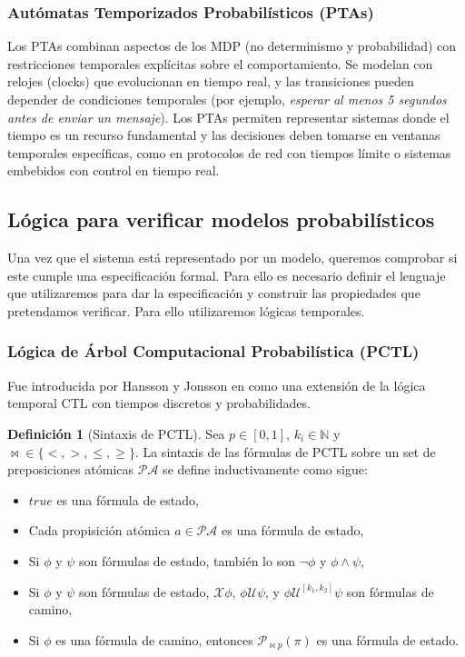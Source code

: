 \documentclass[runningheads]{llncs}
\begin{document}
\subsubsection{Autómatas Temporizados Probabilísticos (PTAs)}

Los PTAs combinan aspectos de los MDP (no determinismo y probabilidad) con restricciones temporales explícitas sobre el comportamiento. Se modelan con relojes (clocks) que evolucionan en tiempo real, y las transiciones pueden depender de condiciones temporales (por ejemplo, \textit{esperar al menos 5 segundos antes de enviar un mensaje}). Los PTAs permiten representar sistemas donde el tiempo es un recurso fundamental y las decisiones deben tomarse en ventanas temporales específicas, como en protocolos de red con tiempos límite o sistemas embebidos con control en tiempo real.

\subsection{Lógica para verificar modelos probabilísticos}

Una vez que el sistema está representado por un modelo, queremos comprobar si este cumple una especificación formal. Para ello es necesario definir el lenguaje que utilizaremos para dar la especificación y construir las propiedades que pretendamos verificar. Para ello utilizaremos lógicas temporales.

\subsubsection{Lógica de Árbol Computacional Probabilística (PCTL)}

Fue introducida por Hansson y Jonsson en \cite{HH94} como una extensión de la lógica temporal CTL con tiempos discretos y probabilidades. \par

\textbf{Definición 1} (Sintaxis de PCTL). Sea $p\in[0,1]$, $k_i\in\mathbb{N}$ y $\bowtie\in\{<,>,\le,\ge\}$. La sintaxis de las fórmulas de PCTL sobre un set de preposiciones atómicas $\mathcal{PA}$ se define inductivamente como sigue:
\begin{itemize}
    \item $true$ es una fórmula de estado,
    \item Cada propisición atómica $a\in\mathcal{PA}$ es una fórmula de estado,
    \item Si $\phi$ y $\psi$ son fórmulas de estado, también lo son $\neg\phi$ y $\phi\land\psi$,
    \item Si $\phi$ y $\psi$ son fórmulas de estado, $\mathcal{X}\phi$, $\phi\mathcal{U}\psi$, y $\phi\mathcal{U}^{[k_1,k_2]}\psi$ son fórmulas de camino,
    \item Si $\phi$ es una fórmula de camino, entonces $\mathcal{P}_{\bowtie p}(\pi)$ es una fórmula de estado.
\end{itemize}\par
\end{document}

